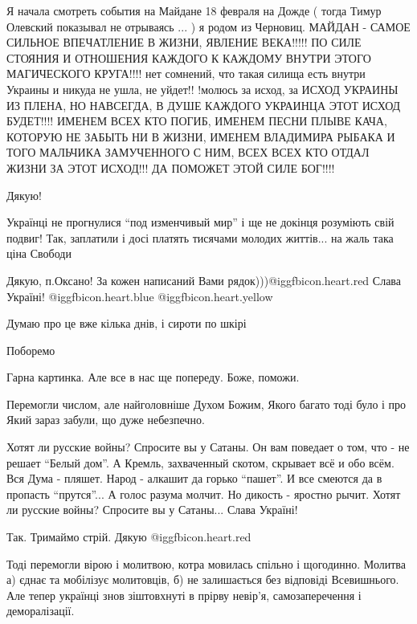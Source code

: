 \begin{itemize}

Я начала смотреть события на Майдане 18 февраля на Дожде ( тогда Тимур Олевский
показывал не отрываясь ... ) я родом из Черновиц. МАЙДАН - САМОЕ СИЛЬНОЕ ВПЕЧАТЛЕНИЕ
В ЖИЗНИ, ЯВЛЕНИЕ ВЕКА!!!!! ПО СИЛЕ СТОЯНИЯ И ОТНОШЕНИЯ КАЖДОГО К КАЖДОМУ ВНУТРИ
ЭТОГО МАГИЧЕСКОГО КРУГА!!!! нет сомнений, что такая силища есть внутри Украины и
никуда не ушла, не уйдет!! !молюсь за исход, за ИСХОД УКРАИНЫ ИЗ ПЛЕНА, НО
НАВСЕГДА, В ДУШЕ КАЖДОГО УКРАИНЦА ЭТОТ ИСХОД БУДЕТ!!!! ИМЕНЕМ ВСЕХ КТО ПОГИБ,
ИМЕНЕМ ПЕСНИ ПЛЫВЕ КАЧА, КОТОРУЮ НЕ ЗАБЫТЬ НИ В ЖИЗНИ, ИМЕНЕМ ВЛАДИМИРА РЫБАКА
И ТОГО МАЛЬЧИКА ЗАМУЧЕННОГО С НИМ, ВСЕХ ВСЕХ КТО ОТДАЛ ЖИЗНИ ЗА ЭТОТ ИСХОД!!! ДА
ПОМОЖЕТ ЭТОЙ СИЛЕ БОГ!!!!


Дякую!


Українці не прогнулися \enquote{под изменчивый мир} і ще не докінця розуміють свій
подвиг! Так, заплатили і досі платять тисячами молодих життів... на жаль така
ціна Свободи


Дякую, п.Оксано! За кожен написаний Вами рядок)))@igg{fbicon.heart.red}
Слава Україні! @igg{fbicon.heart.blue}  @igg{fbicon.heart.yellow} 


Думаю про це вже кілька днів, і сироти по шкірі

Поборемо

Гарна картинка. Але все в нас ще попереду. Боже, поможи.


Перемогли числом, але найголовніше Духом Божим, Якого багато тоді було і про
Який зараз забули, що дуже небезпечно.


Хотят ли русские войны? Спросите вы у Сатаны. Он вам поведает о том, что - не
решает \enquote{Белый дом}. А Кремль, захваченный скотом, скрывает всё и обо всём. Вся
Дума - пляшет. Народ - алкашит да горько \enquote{пашет}. И все смеются да в пропасть
\enquote{прутся}... А голос разума молчит. Но дикость - яростно рычит. Хотят ли русские
войны? Спросите вы у Сатаны... Слава Україні!


Так. Тримаймо стрій. Дякую @igg{fbicon.heart.red}

Тоді перемогли вірою і молитвою, котра мовилась спільно і щогодинно.
Молитва а) єднає та мобілізує молитовців, б) не залишається без відповіді Всевишнього.
Але тепер українці знов зіштовхнуті в прірву невір'я, самозаперечення і деморалізації.


\end{itemize}
